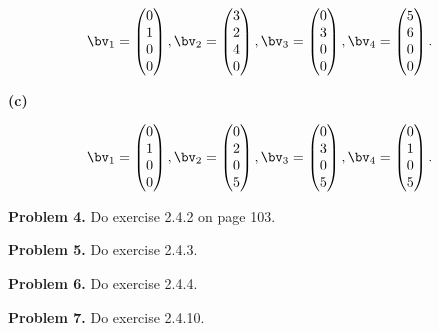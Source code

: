 \documentclass[oneside,12pt]{amsart}
\begin{document}
$$
\bv_1 =
\begin{pmatrix}
0 \\ 1 \\ 0 \\ 0
\end{pmatrix},
\bv_2 =
\begin{pmatrix}
3 \\ 2 \\ 4 \\ 0
\end{pmatrix},
\bv_3 =
\begin{pmatrix}
0 \\ 3 \\ 0 \\ 0
\end{pmatrix},
\bv_4 =
\begin{pmatrix}
5 \\ 6 \\ 0 \\ 0
\end{pmatrix}.
$$

\bigskip
\bigskip
\bigskip
\bigskip

\textbf{(c)}

$$
\bv_1 =
\begin{pmatrix}
0 \\ 1 \\ 0 \\ 0
\end{pmatrix},
\bv_2 =
\begin{pmatrix}
0 \\ 2 \\ 0 \\ 5
\end{pmatrix},
\bv_3 =
\begin{pmatrix}
0 \\ 3 \\ 0 \\ 5
\end{pmatrix},
\bv_4 =
\begin{pmatrix}
0 \\ 1 \\ 0 \\ 5
\end{pmatrix}.
$$

\bigskip
\bigskip
\bigskip
\bigskip

\textbf{Problem 4.} Do exercise 2.4.2 on page 103.

\bigskip
\bigskip
\bigskip

\textbf{Problem 5.} Do exercise 2.4.3.

\bigskip
\bigskip
\bigskip

\textbf{Problem 6.} Do exercise 2.4.4.

\bigskip
\bigskip
\bigskip

\textbf{Problem 7.} Do exercise 2.4.10.
\end{document}
